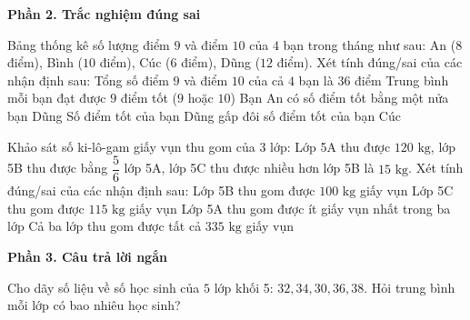 \textbf{Phần 2. Trắc nghiệm đúng sai}

\begin{ex} %
Bảng thống kê số lượng điểm $9$ và điểm $10$ của $4$ bạn trong tháng như sau: An ($8$ điểm), Bình ($10$ điểm), Cúc ($6$ điểm), Dũng ($12$ điểm). Xét tính đúng/sai của các nhận định sau:
\choiceTF
{\True Tổng số điểm $9$ và điểm $10$ của cả $4$ bạn là $36$ điểm}
{\True Trung bình mỗi bạn đạt được $9$ điểm tốt ($9$ hoặc $10$)}
{Bạn An có số điểm tốt bằng một nửa bạn Dũng}
{\True Số điểm tốt của bạn Dũng gấp đôi số điểm tốt của bạn Cúc}
\end{ex}

\begin{ex} %
Khảo sát số ki-lô-gam giấy vụn thu gom của $3$ lớp: Lớp 5A thu được $120\text{ kg}$, lớp 5B thu được bằng $\dfrac{5}{6}$ lớp 5A, lớp 5C thu được nhiều hơn lớp 5B là $15\text{ kg}$. Xét tính đúng/sai của các nhận định sau:
\choiceTF
{\True Lớp 5B thu gom được $100\text{ kg}$ giấy vụn}
{\True Lớp 5C thu gom được $115\text{ kg}$ giấy vụn}
{Lớp 5A thu gom được ít giấy vụn nhất trong ba lớp}
{\True Cả ba lớp thu gom được tất cả $335\text{ kg}$ giấy vụn}
\end{ex}

\textbf{Phần 3. Câu trả lời ngắn}

\begin{ex} %
Cho dãy số liệu về số học sinh của $5$ lớp khối 5: $32, 34, 30, 36, 38$. Hỏi trung bình mỗi lớp có bao nhiêu học sinh?
\end{ex}

